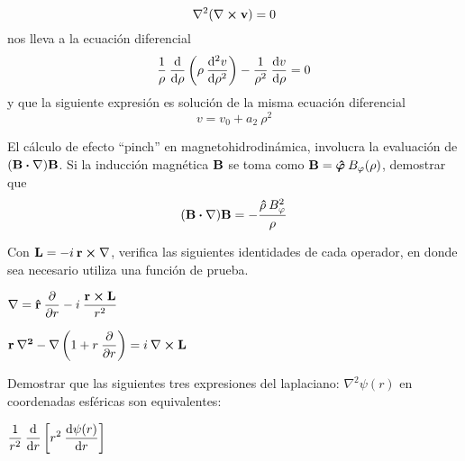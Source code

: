 \documentclass[12pt]{article}
\begin{document}
\begin{milista}
\[ \vb{\nabla}^{2} ( \vb{\nabla} \cp \vb{v}) = 0  \]
nos lleva a la ecuación diferencial
\[ \dfrac{1}{\rho} \: \dv{\rho} \left( \rho \: \dv[2]{v}{\rho} \right) -  \dfrac{1}{\rho^{2}} \: \dv{v}{\rho} = 0 \]
y que la siguiente expresión es solución de la misma ecuación diferencial
\[ v = v_{0} + a_{2} \: \rho^{2} \]
\item El cálculo de efecto \enquote{pinch} en magnetohidrodinámica, involucra la evaluación de $(\vb{B} \vdot \vb{\nabla}) \vb{B}$. Si la inducción magnética $\vb{B}$ se toma como $\vb{B} = \vu*{\varphi} \: B_{\varphi} (\rho)$, demostrar que
\[ (\vb{B} \vdot \vb{\nabla}) \vb{B} = - \dfrac{\vu{\rho} \: B_{\varphi}^{2}}{\rho} \]
\item Con $\vb{L} = -i \: \vb{r} \cp \vb{\nabla}$, verifica las siguientes identidades de cada operador, en donde sea necesario utiliza una función de prueba.
\begin{milista}
\item $\vb{\nabla} = \vu{r} \: \displaystyle \pdv{r} - i \: \dfrac{\vb{r} \cp \vb{L}}{r^{2}}$
\item $\vb{r} \: \vb{\nabla^{2}} - \vb{\nabla} \left( 1 + r \: \displaystyle \pdv{r} \right) = i \: \vb{\nabla} \cp \vb{L}$
\end{milista}
\item Demostrar que las siguientes tres expresiones del laplaciano: $\nabla^{2} \psi(r)$ en coordenadas esféricas son equivalentes:
\begin{milista}\itemsep4pt
\item $\displaystyle \dfrac{1}{r^{2}} \: \dv{r} \left[ r^{2} \: \dv{\psi(r)}{r} \right]$

\end{milista}
\end{milista}
\end{document}
